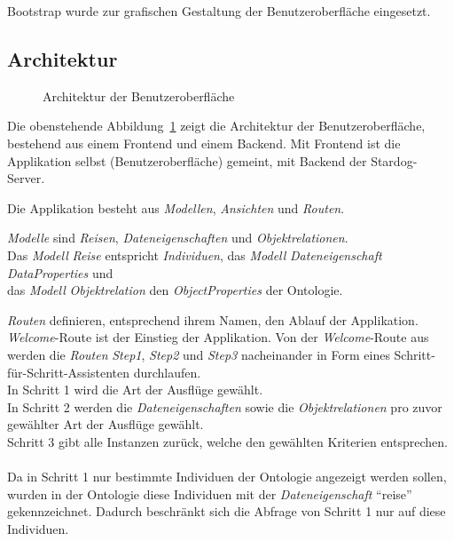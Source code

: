 Bootstrap wurde zur grafischen Gestaltung der Benutzeroberfläche eingesetzt.

\subsection{Architektur}
\label{subsec:komponenten:gui:architektur}
\begin{figure}[H]
    \centering {}
    \caption{Architektur der Benutzeroberfläche\label{fig:architektur:gui}\protect\footnotemark}
\end{figure}

Die obenstehende Abbildung~\ref{fig:architektur:gui} zeigt die Architektur der Benutzeroberfläche, bestehend aus einem Frontend und einem Backend. Mit Frontend ist die Applikation selbst (Benutzeroberfläche) gemeint, mit Backend der Stardog-Server.

Die Applikation besteht aus \textit{Modellen}, \textit{Ansichten} und \textit{Routen}.

\textit{Modelle} sind \textit{Reisen}, \textit{Dateneigenschaften} und \textit{Objektrelationen}.\\
\hangindent=1.5cm Das \textit{Modell} \textit{Reise} entspricht \textit{Individuen}, das \textit{Modell} \textit{Dateneigenschaft} \textit{DataProperties} und\\
das \textit{Modell} \textit{Objektrelation} den \textit{ObjectProperties} der Ontologie.

\textit{Routen} definieren, entsprechend ihrem Namen, den Ablauf der Applikation.\\
\hangindent=1.5cm \textit{Welcome}-Route ist der Einstieg der Applikation. Von der \textit{Welcome}-Route aus werden die \textit{Routen} \textit{Step1}, \textit{Step2} und \textit{Step3} nacheinander in Form eines Schritt-für-Schritt-Assistenten durchlaufen.\\
In Schritt 1 wird die Art der Ausflüge gewählt.\\
In Schritt 2 werden die \textit{Dateneigenschaften} sowie die \textit{Objektrelationen} pro zuvor gewählter Art der Ausflüge gewählt.\\
Schritt 3 gibt alle Instanzen zurück, welche den gewählten Kriterien entsprechen.\\
\\
Da in Schritt 1 nur bestimmte Individuen der Ontologie angezeigt werden sollen, wurden in der Ontologie diese Individuen mit der \textit{Dateneigenschaft} ``reise'' gekennzeichnet. Dadurch beschränkt sich die Abfrage von Schritt 1 nur auf diese Individuen.


